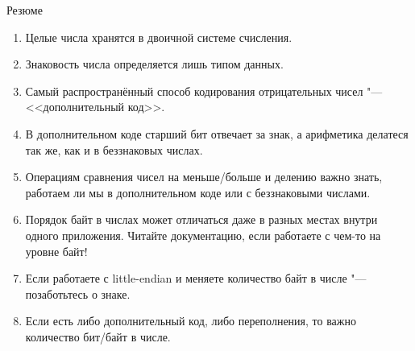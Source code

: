 \begin{frame}{Резюме}
	\begin{enumerate}
		\item
			Целые числа хранятся в двоичной системе счисления.
		\item
			Знаковость числа определяется лишь типом данных.
		\item
			Самый распространённый способ кодирования отрицательных чисел "--- <<дополнительный код>>.
		\item
			В дополнительном коде старший бит отвечает за знак, а арифметика делатеся так же, как и в беззнаковых числах.
		\item
			Операциям сравнения чисел на меньше/больше и делению важно знать, работаем ли мы в дополнительном коде или с беззнаковыми числами.
		\item
			Порядок байт в числах может отличаться даже в разных местах внутри одного приложения.
			Читайте документацию, если работаете с чем-то на уровне байт!
		\item
			Если работаете с little-endian и меняете количество байт в числе "--- позаботьтесь о знаке.
		\item
			Если есть либо дополнительный код, либо переполнения, то важно количество бит/байт в числе.
	\end{enumerate}
\end{frame}
